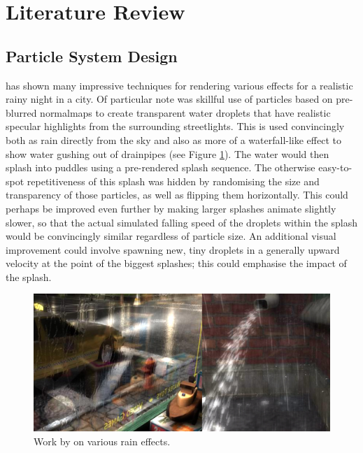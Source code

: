 \documentclass[11pt, a4paper, twocolumn]{article}
\begin{document}
\section{Literature Review}


\subsection{Particle System Design}

\citet{Tatarchuk2006} has shown many impressive techniques for rendering various effects for a realistic rainy night in a city. Of particular note was skillful use of particles based on pre-blurred normalmaps to create transparent water droplets that have realistic specular highlights from the surrounding streetlights. This is used convincingly both as rain directly from the sky and also as more of a waterfall-like effect to show water gushing out of drainpipes (see Figure \ref{fig:tatarchuk}). The water would then splash into puddles using a pre-rendered splash sequence. The otherwise easy-to-spot repetitiveness of this splash was hidden by randomising the size and transparency of those particles, as well as flipping them horizontally. This could perhaps be improved even further by making larger splashes animate slightly slower, so that the actual simulated falling speed of the droplets within the splash would be convincingly similar regardless of particle size. An additional visual improvement could involve spawning new, tiny droplets in a generally upward velocity at the point of the biggest splashes; this could emphasise the impact of the splash. %

\begin{figure}[h]
\includegraphics[width=\linewidth]{tatarchuk}
\caption{Work by \citet{Tatarchuk2006} on various rain effects.}
\label{fig:tatarchuk}
\end{figure}
\end{document}
